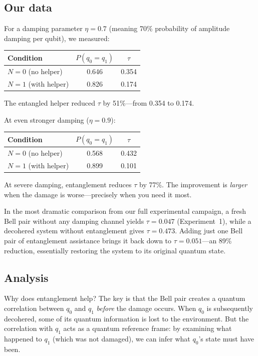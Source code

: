 \documentclass[amsmath,amssymb,reprint,aps,prb]{revtex4-2}
\begin{document}
\subsection{Our data}

For a damping parameter $\eta = 0.7$ (meaning 70\% probability
of amplitude damping per qubit), we measured:
\begin{center}
\begin{tabular}{lcc}
\toprule
Condition & $P(q_0 = q_1)$ & $\tau$ \\
\midrule
$N = 0$ (no helper)   & 0.646 & 0.354 \\
$N = 1$ (with helper) & 0.826 & 0.174 \\
\bottomrule
\end{tabular}
\end{center}
The entangled helper reduced $\tau$ by 51\%---from 0.354 to 0.174.

At even stronger damping ($\eta = 0.9$):
\begin{center}
\begin{tabular}{lcc}
\toprule
Condition & $P(q_0 = q_1)$ & $\tau$ \\
\midrule
$N = 0$ (no helper)   & 0.568 & 0.432 \\
$N = 1$ (with helper) & 0.899 & 0.101 \\
\bottomrule
\end{tabular}
\end{center}
At severe damping, entanglement reduces $\tau$ by 77\%.  The
improvement is \emph{larger} when the damage is worse---precisely
when you need it most.

In the most dramatic comparison from our full experimental
campaign, a fresh Bell pair without any damping channel yields
$\tau = 0.047$ (Experiment~1), while a decohered system without
entanglement gives $\tau = 0.473$.  Adding just one Bell pair of
entanglement assistance brings it back down to $\tau = 0.051$---an
89\% reduction, essentially restoring the system to its original
quantum state.

\subsection{Analysis}

Why does entanglement help?  The key is that the Bell pair creates
a quantum correlation between $q_0$ and $q_1$ \emph{before} the
damage occurs.  When $q_0$ is subsequently decohered, some of its
quantum information is lost to the environment.  But the
correlation with $q_1$ acts as a quantum reference frame: by
examining what happened to $q_1$ (which was not damaged), we can
infer what $q_0$'s state must have been.
\end{document}
